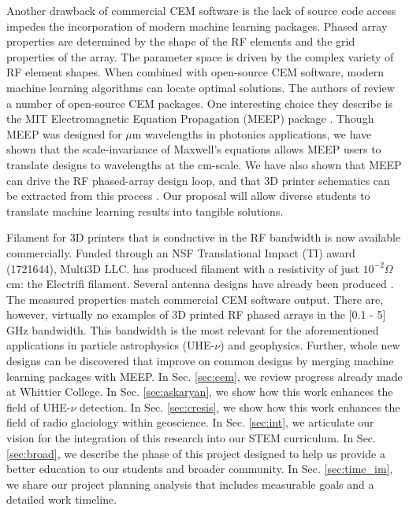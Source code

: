 \documentclass[11pt]{amsart}
\begin{document}
Another drawback of commercial CEM software is the lack of source code access impedes the incorporation of modern machine learning packages.  Phased array properties are determined by the shape of the RF elements and the grid properties of the array.  The parameter space is driven by the complex variety of RF element shapes.  When combined with open-source CEM software, modern machine learning algorithms can locate optimal solutions.  The authors of \cite{10.3390/electronics8121506} review a number of open-source CEM packages.  One interesting choice they describe is the MIT Electromagnetic Equation Propagation (MEEP) package \cite{10.1016/j.cpc.2009.11.008}.  Though MEEP was designed for $\mu$m wavelengths in photonics applications, we have shown that the scale-invariance of Maxwell's equations allows MEEP users to translate designs to wavelengths at the cm-scale.  We have also shown that MEEP can drive the RF phased-array design loop, and that 3D printer schematics can be extracted from this process \cite{electronics10040415,meepcon2022,10.1016/j.cpc.2009.11.008}.  Our proposal will allow diverse students to translate machine learning results into tangible solutions.  

Filament for 3D printers that is conductive in the RF bandwidth is now available commercially.  Funded through an NSF Translational Impact (TI) award (1721644), Multi3D LLC. has produced filament with a resistivity of just $10^{-2} \Omega$ cm: the Electrifi filament.  Several antenna designs have already been produced \cite{8786183,10.1049/iet-map.2017.0104}.  The measured properties match commercial CEM software output.  There are, however, virtually no examples of 3D printed RF phased arrays in the [0.1 - 5] GHz bandwidth.  This bandwidth is the most relevant for the aforementioned applications in particle astrophysics (UHE-$\nu$) and geophysics.  Further, whole new designs can be discovered that improve on common designs by merging machine learning packages with MEEP.  In Sec. \ref{sec:cem}, we review progress already made at Whittier College.  In Sec. \ref{sec:askaryan}, we show how this work enhances the field of UHE-$\nu$ detection.  In Sec. \ref{sec:cresis}, we show how this work enhances the field of radio glaciology within geoscience.  In Sec. \ref{sec:int}, we articulate our vision for the integration of this research into our STEM curriculum.  In Sec. \ref{sec:broad}, we describe the phase of this project designed to help us provide a better education to our students and broader community.  In Sec. \ref{sec:time_im}, we share our project planning analysis that includes measurable goals and a detailed work timeline.
\end{document}
